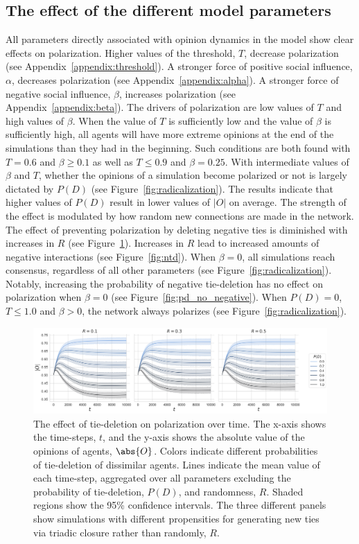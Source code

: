\documentclass[11pt]{article}
\DeclarePairedDelimiter{\abs}\lvert\rvert
\begin{document}
\subsection{The effect of the different model parameters}
All parameters directly associated with opinion dynamics in the model show clear effects on polarization. Higher values of the threshold, $T$, decrease polarization (see Appendix~\ref{appendix:threshold}). A stronger force of positive social influence, $\alpha$, decreases polarization (see Appendix~\ref{appendix:alpha}). A stronger force of negative social influence, $\beta$, increases polarization (see Appendix~\ref{appendix:beta}).
The drivers of polarization are low values of $T$ and high values of $\beta$. When the value of $T$ is sufficiently low and the value of $\beta$ is sufficiently high, all agents will have more extreme opinions at the end of the simulations than they had in the beginning. Such conditions are both found with $T = 0.6$ and $\beta \geq 0.1$ as well as $T \leq 0.9$ and $\beta = 0.25$. With intermediate values of $\beta$ and $T$, whether the opinions of a simulation become polarized or not is largely dictated by $P(D)$ (see Figure~\ref{fig:radicalization}). 
The results indicate that higher values of $P(D)$ result in lower values of $|O|$ on average. 
The strength of the effect is modulated by how random new connections are made in the network. 
The effect of preventing polarization by deleting negative ties is diminished with increases in $R$ (see Figure~\ref{fig:pd}). Increases in $R$ lead to increased amounts of negative interactions (see Figure~\ref{fig:ntd}). 
When $\beta = 0$, all simulations reach consensus, regardless of all other parameters (see Figure~\ref{fig:radicalization}). Notably, increasing the probability of negative tie-deletion has no effect on polarization when $\beta = 0$ (see Figure~\ref{fig:pd_no_negative}). 
When $P(D) = 0$, $T \leq 1.0$ and $\beta > 0$, the network always polarizes (see Figure~\ref{fig:radicalization}).

\begin{figure}[H]
    \centering
    \includegraphics[width=.99\linewidth]{../plots/overall/Absolute_Opinion_Tie_Dissolution.png}
  \caption{The effect of tie-deletion on polarization over time. The x-axis shows the time-steps, $t$, and the y-axis shows the absolute value of the opinions of agents, $\abs{O}$. Colors indicate different probabilities of tie-deletion of dissimilar agents. Lines indicate the mean value of each time-step, aggregated over all parameters excluding the probability of tie-deletion, $P(D)$, and randomness, $R$. Shaded regions show the 95\% confidence intervals. The three different panels show simulations with different propensities for generating new ties via triadic closure rather than randomly, $R$.}
  \label{fig:pd}
\end{figure}
\end{document}
